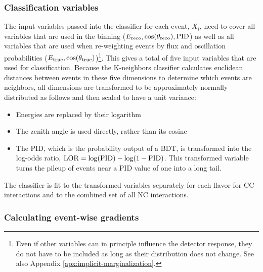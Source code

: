 \subsubsection{Classification variables}
The input variables passed into the classifier for each event, $X_i$, need to cover all variables that are used in the binning ($E_{\rm reco},\cos(\theta_{\rm reco}),{\rm PID}$) as well as all variables that are used when re-weighting events by flux and oscillation probabilities ($E_{\rm true},\cos(\theta_{\rm true})$)\footnote{Even if other variables can in principle influence the detector response, they do not have to be included as long as their distribution does not change.
See also Appendix \ref{apx:implicit-marginalization}.}.
This gives a total of five input variables that are used for classification.
Because the K-neighbors classifier calculates euclidean distances between events in these five dimensions to determine which events are neighbors, all dimensions are transformed to be approximately normally distributed as follows and then scaled to have a unit variance:
\begin{itemize}
    \item Energies are replaced by their logarithm
    \item The zenith angle is used directly, rather than its cosine
    \item The PID, which is the probability output of a BDT, is transformed into the log-odds ratio, $\mathrm{LOR}=\log({\rm PID}) - \log(1-{\rm PID})$.
This transformed variable turns the pileup of events near a PID value of one into a long tail.
\end{itemize}
The classifier is fit to the transformed variables separately for each flavor for CC interactions and to the combined set of all NC interactions.

\subsubsection{Calculating event-wise gradients}

